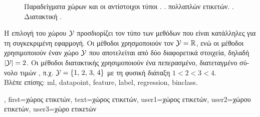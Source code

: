 {{\begin{figure}[H]
		{
		\caption{\label{fig_label_spaces_dict} \foreignlanguage{greek}{Παραδείγματα χώρων}  \foreignlanguage{greek}{και οι 
			αντίστοιχοι τύποι} .  .  
			 \foreignlanguage{greek}{πολλαπλών ετικετών}.  . 
			 \foreignlanguage{greek}{Διατακτική} .} }
		\end{figure}
		\foreignlanguage{greek}{Η επιλογή του χώρου}  $\mathcal{Y}$ \foreignlanguage{greek}{προσδιορίζει τον τύπο των 
		μεθόδων}  \foreignlanguage{greek}{που είναι κατάλληλες για τη συγκεκριμένη εφαρμογή. Οι μέθοδοι}  
		\foreignlanguage{greek}{χρησμοποιούν τον} $\mathcal{Y} = \mathbb{R}$, \foreignlanguage{greek}{ενώ οι μέθοδοι}  
		\foreignlanguage{greek}{χρησιμοποιούν έναν χώρο}  $\mathcal{Y}$ \foreignlanguage{greek}{που αποτελείται από δύο 
		διαφορετικά στοιχεία, δηλαδή $|\mathcal{Y}|=2$. Οι μέθοδοι διατακτικής}  \foreignlanguage{greek}{χρησιμοποιούν 
		ένα πεπερασμένο, διατεταγμένο σύνολο τιμών} , \foreignlanguage{greek}{π.χ. $\mathcal{Y} = \{1,\,2,\,3,\,4\}$ με τη 
		φυσική διάταξη $1 < 2 < 3 < 4$.}
		\\
		\foreignlanguage{greek}{Βλέπε επίσης:} \gls{ml}, \gls{datapoint}, \gls{feature}, \gls{label}, \gls{regression}, \gls{binclass}.}, 
	first={\foreignlanguage{greek}{χώρος ετικετών}},
	text={\foreignlanguage{greek}{χώρος ετικετών}},
	user1={\foreignlanguage{greek}{χώρος ετικετών}}, %
  	user2={\foreignlanguage{greek}{χώρου ετικετών}}, %
	user3={\foreignlanguage{greek}{χώρο ετικετών}} %
}

